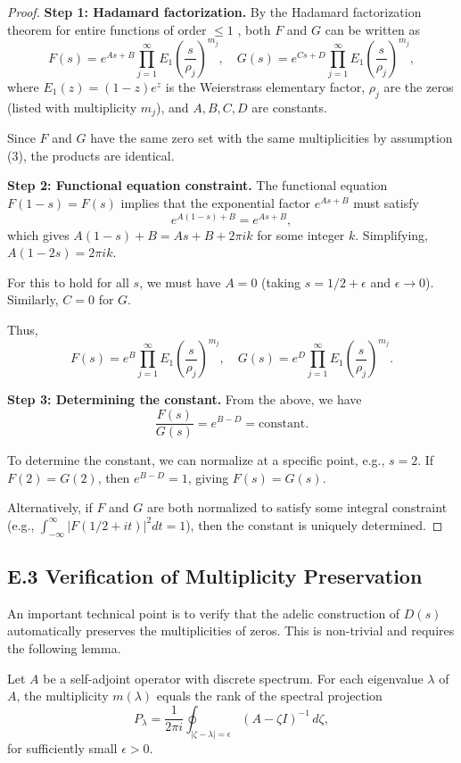 \begin{proof}
\textbf{Step 1: Hadamard factorization.}
By the Hadamard factorization theorem for entire functions of order $\leq 1$ \cite{levin1996}, both $F$ and $G$ can be written as
\[
F(s) = e^{As + B} \prod_{j=1}^{\infty} E_1\left(\frac{s}{\rho_j}\right)^{m_j}, \quad G(s) = e^{Cs + D} \prod_{j=1}^{\infty} E_1\left(\frac{s}{\rho_j}\right)^{m_j},
\]
where $E_1(z) = (1-z)e^z$ is the Weierstrass elementary factor, $\rho_j$ are the zeros (listed with multiplicity $m_j$), and $A, B, C, D$ are constants.

Since $F$ and $G$ have the same zero set with the same multiplicities by assumption (3), the products are identical.

\textbf{Step 2: Functional equation constraint.}
The functional equation $F(1-s) = F(s)$ implies that the exponential factor $e^{As + B}$ must satisfy
\[
e^{A(1-s) + B} = e^{As + B},
\]
which gives $A(1-s) + B = As + B + 2\pi i k$ for some integer $k$. Simplifying, $A(1 - 2s) = 2\pi i k$.

For this to hold for all $s$, we must have $A = 0$ (taking $s = 1/2 + \epsilon$ and $\epsilon \to 0$). Similarly, $C = 0$ for $G$.

Thus,
\[
F(s) = e^B \prod_{j=1}^{\infty} E_1\left(\frac{s}{\rho_j}\right)^{m_j}, \quad G(s) = e^D \prod_{j=1}^{\infty} E_1\left(\frac{s}{\rho_j}\right)^{m_j}.
\]

\textbf{Step 3: Determining the constant.}
From the above, we have
\[
\frac{F(s)}{G(s)} = e^{B-D} = \text{constant}.
\]

To determine the constant, we can normalize at a specific point, e.g., $s = 2$. If $F(2) = G(2)$, then $e^{B-D} = 1$, giving $F(s) = G(s)$.

Alternatively, if $F$ and $G$ are both normalized to satisfy some integral constraint (e.g., $\int_{-\infty}^{\infty} |F(1/2 + it)|^2 dt = 1$), then the constant is uniquely determined.
\end{proof}

\subsection*{E.3 Verification of Multiplicity Preservation}

An important technical point is to verify that the adelic construction of $D(s)$ automatically preserves the multiplicities of zeros. This is non-trivial and requires the following lemma.

\begin{lemma}\label{lem:multiplicity-resolvent}
Let $A$ be a self-adjoint operator with discrete spectrum. For each eigenvalue $\lambda$ of $A$, the multiplicity $m(\lambda)$ equals the rank of the spectral projection
\[
P_\lambda = \frac{1}{2\pi i} \oint_{|\zeta - \lambda| = \epsilon} (A - \zeta I)^{-1} \, d\zeta,
\]
for sufficiently small $\epsilon > 0$.
\end{lemma}

